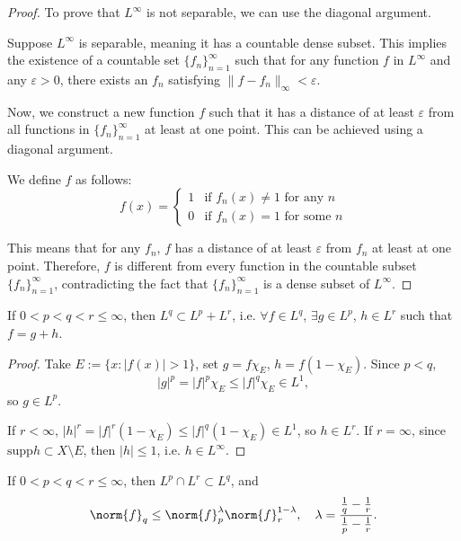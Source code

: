 \begin{proof}
    To prove that $L^{\infty}$ is not separable, 
    we can use the diagonal argument.

    Suppose $L^{\infty}$ is separable, meaning it has a 
    countable dense subset. This implies the existence of a 
    countable set $\{f_n\}_{n=1}^{\infty}$ such that for any 
    function $f$ in $L^{\infty}$ and any $\varepsilon > 0$, 
    there exists an $f_n$ satisfying $\|f - f_n\|_{\infty} < 
    \varepsilon$.

    Now, we construct a new function $f$ such that it has a 
    distance of at least $\varepsilon$ from all functions in 
    $\{f_n\}_{n=1}^{\infty}$ at least at one point. 
    This can be achieved using a diagonal argument.

    We define $f$ as follows:
    $$
    f(x) = \begin{cases} 
        1 & \text{if } f_n(x) \neq 1 \text{ for any } n \\
        0 & \text{if } f_n(x) = 1 \text{ for some } n
    \end{cases}
    $$

    This means that for any $f_n$, $f$ has a distance of at 
    least $\varepsilon$ from $f_n$ at least at one point. 
    Therefore, $f$ is different from every function in the 
    countable subset $\{f_n\}_{n=1}^{\infty}$, contradicting 
    the fact that $\{f_n\}_{n=1}^{\infty}$ is a dense subset 
    of $L^{\infty}$.
\end{proof}
\begin{prop}
    \label{Prop:InterpolationIneq1}
    If $0<p<q<r\le\infty$, then $L^{q}\subset L^{p}+L^{r}$, i.e. 
    $\forall f\in L^{q}$, $\exists g\in L^{p}$, $h\in L^{r}$ 
    such that $f=g+h$.
\end{prop}
\begin{proof}
    Take $E:=\{x:|f(x)|>1\}$, set $g=f\chi_{E}$, $h=f(1-\chi_{E})$. 
    Since $p<q$, 
    \begin{displaymath}
        |g|^{p}=|f|^{p}\chi_{E}\le |f|^{q}\chi_{E}\in L^{1},
    \end{displaymath}
    so $g\in L^{p}$. 

    If $r<\infty$, $|h|^r=|f|^{r}(1-\chi_{E})\le|f|^{q}(1-\chi_{E})
    \in L^{1}$, so $h\in L^{r}$. 
    If $r=\infty$, since $\text{supp}h\subset X\setminus E$, 
    then $|h|\le 1$, i.e. $h\in L^{\infty}$.
\end{proof}
\begin{prop}
    \label{Prop:InterpolationIneq2}
    If $0<p<q<r\le\infty$, then $L^{p}\cap L^{r}\subset L^{q}$, 
    and 
    \begin{displaymath}
        \norm{f}_{q}\le\norm{f}_{p}^{\lambda}\norm{f}_{r}^{1-\lambda},
        \quad
        \lambda=\frac{\frac{1}{q}-\frac{1}{r}}{\frac{1}{p}-\frac{1}{r}}.
    \end{displaymath}
\end{prop}
